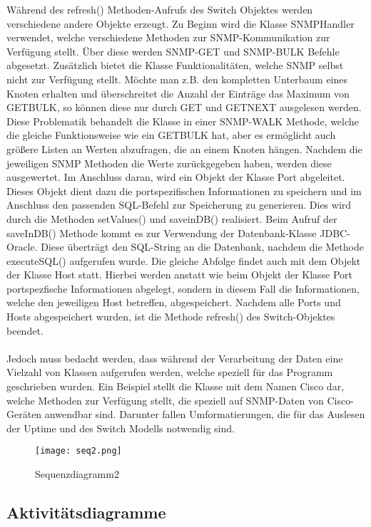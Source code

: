 Während des refresh() Methoden-Aufrufs des Switch Objektes werden verschiedene andere Objekte erzeugt. Zu Beginn wird die Klasse SNMPHandler verwendet, welche verschiedene Methoden zur SNMP-Kommunikation zur Verfügung stellt. Über diese werden SNMP-GET und SNMP-BULK Befehle abgesetzt. Zusätzlich bietet die Klasse Funktionalitäten, welche SNMP selbst nicht zur Verfügung stellt. Möchte man z.B. den kompletten Unterbaum eines Knoten erhalten und überschreitet die Anzahl der Einträge das Maximum von GETBULK, so können diese nur durch GET und GETNEXT ausgelesen werden. Diese Problematik behandelt die Klasse in einer SNMP-WALK Methode, welche die gleiche Funktionsweise wie ein GETBULK hat, aber es ermöglicht auch größere Listen an Werten abzufragen, die an einem Knoten hängen. Nachdem die jeweiligen SNMP Methoden die Werte zurückgegeben haben, werden diese ausgewertet. Im Anschluss daran, wird ein Objekt der Klasse Port abgeleitet.
Dieses Objekt dient dazu die portspezifischen Informationen zu speichern und im Anschluss den passenden SQL-Befehl zur Speicherung zu generieren. Dies wird durch die Methoden setValues() und saveinDB() realisiert.
Beim Aufruf der saveInDB() Methode kommt es zur Verwendung der Datenbank-Klasse JDBC-Oracle. Diese überträgt den SQL-String an die Datenbank, nachdem die Methode executeSQL() aufgerufen wurde.
Die gleiche Abfolge findet auch mit dem Objekt der Klasse Host statt. Hierbei werden anstatt wie beim Objekt der Klasse Port portspezfische Informationen abgelegt, sondern in diesem Fall die Informationen, welche den jeweiligen Host betreffen, abgespeichert.
Nachdem alle Ports und Hosts abgespeichert wurden, ist die Methode refresh() des Switch-Objektes beendet.\\\\
Jedoch muss bedacht werden, dass während der Verarbeitung der Daten eine Vielzahl von Klassen aufgerufen werden, welche speziell für das Programm geschrieben wurden.
Ein Beispiel stellt die Klasse mit dem Namen Cisco dar, welche Methoden zur Verfügung stellt, die speziell auf SNMP-Daten von Cisco-Geräten anwendbar sind.
Darunter fallen Umformatierungen, die für das Auslesen der Uptime und des Switch Modells notwendig sind.


\begin{figure}[H]
\centering
\texttt{[image: seq2.png]}
\caption{Sequenzdiagramm2}
\label{fig:sequecediagram2}
\end{figure}

\subsection{Aktivitätsdiagramme}
\label{subsec:acitvitydiagrams}

